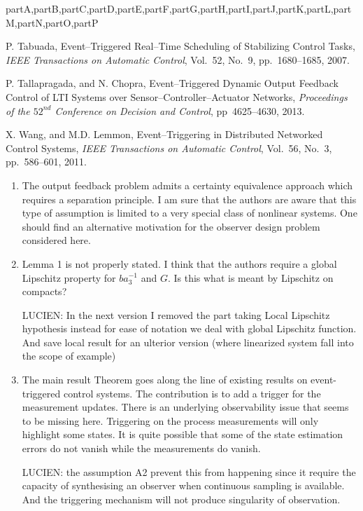 \documentclass[letterpaper, 10 pt, conference]{ieeeconf}
\def\compile{partA,partB,partC,partD,partE,partF,partG,partH,partI,partJ,partK,partL,partM,partN,partO,partP}
\newenvironment{partP}[1][]{}{}
\begin{document}
\begin{xcomment}{\compile}
\begin{partP}
\begin{thebibliography}{99}
 P. Tabuada, Event--Triggered Real--Time Scheduling of Stabilizing Control Tasks, {\sl IEEE Transactions on Automatic Control}, Vol.~52, No.~9, pp.~1680--1685, 2007.

 P. Tallapragada, and N. Chopra, Event--Triggered Dynamic Output Feedback Control of LTI Systems over Sensor--Controller--Actuator Networks, {\sl  Proceedings of the $52^{nd}$ Conference on Decision and Control}, pp~4625--4630, 2013.

 X. Wang, and M.D. Lemmon, Event--Triggering in Distributed Networked Control Systems, {\sl IEEE Transactions on Automatic Control}, Vol.~56, No.~3, pp.~586--601, 2011.

\end{thebibliography}


\end{partP}
\begin{partQ}



\begin{enumerate}
\item The output feedback problem admits a certainty equivalence approach which requires a separation principle. I am sure that the authors are aware that this type of assumption is limited to a very special class of nonlinear systems. One should find an alternative motivation for the observer design problem considered here. 

\item Lemma 1 is not properly stated. I think that the authors require a global Lipschitz property for $b a_3^{-1}$ and $G$. Is this what is meant by Lipschitz on compacts?

LUCIEN: In the next version I removed the part taking Local Lipschitz hypothesis instead for ease of notation we deal with global Lipschitz function. And save local result for an ulterior version (where linearized system fall into the scope of example) 


\item The main result Theorem goes along the line of existing results on event-triggered control systems. The contribution is to add a trigger for the measurement updates.  There is an underlying observability issue that seems to be missing here. Triggering on the process measurements will only highlight some states. It is quite possible that some of the state estimation errors do not vanish while the measurements do vanish.  

LUCIEN: the assumption A2 prevent this from happening since it require the capacity of synthesising an observer when continuous sampling is available. And the triggering mechanism will not produce singularity of observation.



\end{enumerate}
\end{partQ}
\end{xcomment}
\end{document}

